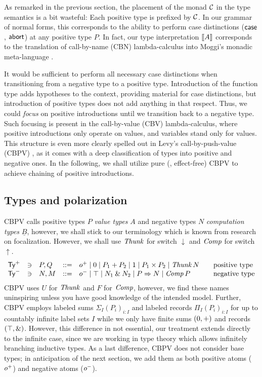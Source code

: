 \documentclass[a4paper,USenglish,cleveref, autoref]{lipics-v2019}
\begin{document}
As remarked in the previous section, the placement of the monad $\mathcal{C}$
in the type semantics is a bit wasteful:  Each positive type is
prefixed by $\mathcal{C}$.  In our grammar of normal forms, this corresponds to
the ability to perform case distinctions ($\mathsf{case}$, $\mathsf{abort}$) at any
positive type $P$.  In fact, our type interpretation $\mathopen{{[\kern-0.14em[}} A \mathclose{{]\kern-0.14em]}}$
corresponds to the translation of call-by-name (CBN) lambda-calculus
into Moggi's monadic meta-language \cite{moggi:infcomp91,levy:hosc06}.

It would be sufficient %
to perform all necessary
case distinctions
when transitioning from a negative type to a positive type.
Introduction of the function type adds hypotheses to the context,
providing material for case distinctions, but introduction of positive
types does not add anything in that respect.  Thus, we could
\emph{focus} on positive introductions until we transition back to a
negative type.  Such focusing is present in the call-by-value (CBV)
lambda-calculus, where positive introductions only operate on values,
and variables stand only for values.  This structure is even more
clearly spelled out in Levy's call-by-push-value (CBPV)
\cite{levy:hosc06}, as it comes with a deep classification of types
into positive and negative ones.  In the following, we shall utilize
pure (\ie, effect-free) CBPV to achieve chaining of positive
introductions.

\subsection{Types and polarization}

CBPV calls positive types $P$ \emph{value types} $A$ and negative
types $N$
\emph{computation types} $\underline B$,
however, we shall stick to our terminology
which is known from research on focalization.
However, we shall use $\mathit{Thunk}$ for switch $\downarrow$ and $\mathit{Comp}$ for
switch $\uparrow$.
\[
\begin{array}{lllrl@{\qquad}l}
  \PTy & \ni & P,Q & ::= & \patom
    \mid \tyzero \mid P_1 + P_2
    \mid \tyone \mid P_1 \times P_2
    \mid \Thunk N
  & \mbox{positive type}
\\
  \NTy & \ni & N,M & ::= & \natom
    \mid \top \mid N_1 \ntimes N_2
    \mid P \To N
    \mid \Comp P
  & \mbox{negative type}
\\
\end{array}
\]
CBPV uses $U$ for $\mathit{Thunk}$ and $F$ for $\mathit{Comp}$, however, we find
these names uninspiring unless you have good knowledge of the intended
model.  Further, CBPV employs labeled sums $\Sigma_I (P_i)_{i : I}$
and labeled records $\Pi_I (P_i)_{i : I}$ for up to countably infinite
label sets $I$ while we only have finite sums $(0,+)$ and
records $(\top,\mathbin{\&})$.  However, this difference in not essential,
our treatment extends directly to the infinite case, since we are
working in type theory which allows infinitely branching inductive
types.   As a last difference, CBPV does not consider base types; in
anticipation of the next section, we add them as both positive atoms
($o^+$) and negative atoms ($o^-$).
\end{document}
